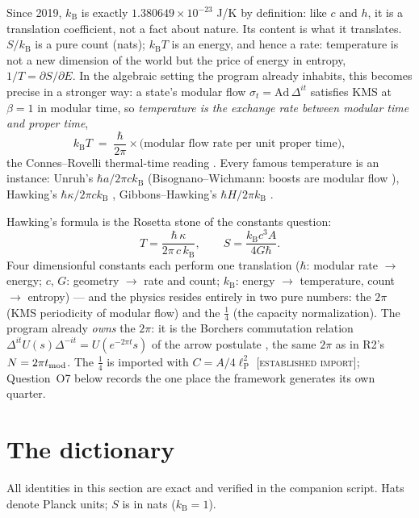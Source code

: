 \documentclass[11pt,reqno]{amsart}
\numberwithin{equation}{section}
\theoremstyle{definition}
\theoremstyle{remark}
\newcommand{\slab}[1]{\textup{[\textsc{#1}]}}
\newcommand{\lP}{\ell_{\mathrm P}}
\newcommand{\kB}{k_{\mathrm B}}
\begin{document}
Since 2019, $\kB$ is exactly $1.380649\times10^{-23}$ J/K by definition:
like $c$ and $h$, it is a translation coefficient, not a fact about
nature. Its content is what it translates. $S/\kB$ is a pure count
(nats); $\kB T$ is an energy, and hence a rate: temperature is not a new
dimension of the world but the price of energy in entropy,
$1/T=\partial S/\partial E$. In the algebraic setting the program already
inhabits, this becomes precise in a stronger way: a state's modular flow
$\sigma_t=\mathrm{Ad}\,\Delta^{it}$ satisfies KMS at $\beta=1$ in modular
time, so \emph{temperature is the exchange rate between modular time and
proper time},
\begin{equation}\label{eq:modularT}
\kB T \;=\; \frac{\hbar}{2\pi}\times
\bigl(\text{modular flow rate per unit proper time}\bigr),
\end{equation}
the Connes--Rovelli thermal-time reading \cite{ConnesRovelli}. Every
famous temperature is an instance: Unruh's $\hbar a/2\pi c\kB$
(Bisognano--Wichmann: boosts are modular flow \cite{BW1976,Unruh1976}),
Hawking's $\hbar\kappa/2\pi c\kB$ \cite{Hawking1975}, Gibbons--Hawking's
$\hbar H/2\pi\kB$ \cite{GH1977}.

Hawking's formula is the Rosetta stone of the constants question:
\[
T=\frac{\hbar\,\kappa}{2\pi\,c\,\kB},\qquad
S=\frac{\kB c^3 A}{4G\hbar}.
\]
Four dimensionful constants each perform one translation ($\hbar$:
modular rate $\to$ energy; $c$, $G$: geometry $\to$ rate and count;
$\kB$: energy $\to$ temperature, count $\to$ entropy) --- and the physics
resides entirely in two pure numbers: the $2\pi$ (KMS periodicity of
modular flow) and the $\tfrac14$ (the capacity normalization). The
program already \emph{owns} the $2\pi$: it is the Borchers commutation
relation $\Delta^{it}U(s)\Delta^{-it}=U(e^{-2\pi t}s)$ of the arrow
postulate \cite{Borchers1992,Ruble2026a}, the same $2\pi$ as in R2's
$N=2\pi t_{\rm mod}$. The $\tfrac14$ is imported with
$C=A/4\lP^2$ \slab{established import}; Question~O7 below records the one
place the framework generates its own quarter.

\section{The dictionary}\label{sec:dictionary}

All identities in this section are exact and verified in the companion
script. Hats denote Planck units; $S$ is in nats ($\kB=1$).
\end{document}
